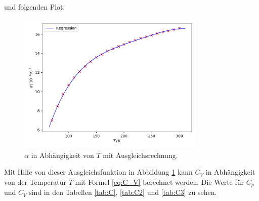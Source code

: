 und folgenden Plot:

\begin{figure}[H]
    \centering
    \includegraphics[width=0.8\textwidth]{build/alpha.pdf}
    \caption{$\alpha$ in Abhängigkeit von $T$ mit Ausgleichsrechnung.}
    \label{fig:alpha_plot}
\end{figure}

Mit Hilfe von dieser Ausgleichsfunktion in Abbildung \ref{fig:alpha_plot} kann $C_V$ in Abhängigkeit von der Temperatur $T$ mit Formel \eqref{eq:C_V} berechnet werden. Die Werte für $C_p$ und $C_V$ sind in den Tabellen \ref{tab:C}, \ref{tab:C2} und \ref{tab:C3} zu sehen.

